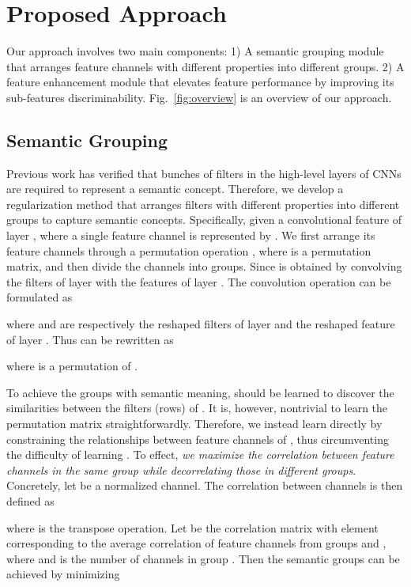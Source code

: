 \documentclass[journal]{IEEEtran}
\begin{document}
\section{Proposed Approach}
\label{sec:model}
Our approach involves two main components: 1) A semantic grouping module that arranges feature channels with different properties into different groups. 2) A feature enhancement module that elevates feature performance by improving its sub-features discriminability. Fig.~\ref{fig:overview} is an overview of our approach.

\subsection{Semantic Grouping}
\label{sec:group}
Previous work \cite{net2vec@18cvpr} has verified that bunches of filters in the high-level layers of CNNs are required to represent a semantic concept. Therefore, we develop a regularization method that arranges filters with different properties into different groups to capture semantic concepts. Specifically, given a convolutional feature  of layer , where a single feature channel is represented by . We first arrange its feature channels through a permutation operation , where  is a permutation matrix, and then divide the channels into  groups. Since  is obtained by convolving the filters of layer  with the features of layer . The convolution operation can be formulated as

where  and  are respectively the reshaped filters of layer  and the reshaped feature of layer . Thus  can be rewritten as

where  is a permutation of .

To achieve the groups with semantic meaning,  should be learned to discover the similarities between the filters (rows) of . It is, however, nontrivial to learn the permutation matrix straightforwardly. Therefore, we instead learn  directly by constraining the relationships between feature channels of , thus circumventing the difficulty of learning . 
To effect, {\it we maximize the correlation between feature channels in the same group while decorrelating those in different groups}. Concretely, let  be a normalized channel. The correlation between channels is then defined as

where  is the transpose operation. Let  be the correlation matrix with element  corresponding to the average correlation of feature channels from groups  and , where  and  is the number of channels in group . Then the semantic groups can be achieved by minimizing
\end{document}
